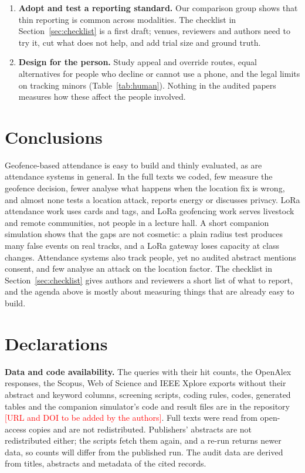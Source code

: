 \documentclass[12pt]{article}
\newcommand{\todo}[1]{\textcolor{red}{[#1]}}
\begin{document}
\begin{enumerate}
\item \textbf{Adopt and test a reporting standard.} Our comparison group shows that thin reporting is common across modalities. The checklist in Section~\ref{sec:checklist} is a first draft; venues, reviewers and authors need to try it, cut what does not help, and add trial size and ground truth.
\item \textbf{Design for the person.} Study appeal and override routes, equal alternatives for people who decline or cannot use a phone, and the legal limits on tracking minors (Table~\ref{tab:human}). Nothing in the audited papers measures how these affect the people involved.
\end{enumerate}

\section{Conclusions}
Geofence-based attendance is easy to build and thinly evaluated, as are attendance systems in general. In the full texts we coded, few measure the geofence decision, fewer analyse what happens when the location fix is wrong, and almost none tests a location attack, reports energy or discusses privacy. LoRa attendance work uses cards and tags, and LoRa geofencing work serves livestock and remote communities, not people in a lecture hall. A short companion simulation shows that the gaps are not cosmetic: a plain radius test produces many false events on real tracks, and a LoRa gateway loses capacity at class changes. Attendance systems also track people, yet no audited abstract mentions consent, and few analyse an attack on the location factor. The checklist in Section~\ref{sec:checklist} gives authors and reviewers a short list of what to report, and the agenda above is mostly about measuring things that are already easy to build.

\section*{Declarations}
\noindent\textbf{Data and code availability.} The queries with their hit counts, the OpenAlex responses, the Scopus, Web of Science and IEEE Xplore exports without their abstract and keyword columns, screening scripts, coding rules, codes, generated tables and the companion simulator's code and result files are in the repository \todo{URL and DOI to be added by the authors}. Full texts were read from open-access copies and are not redistributed. Publishers' abstracts are not redistributed either; the scripts fetch them again, and a re-run returns newer data, so counts will differ from the published run. The audit data are derived from titles, abstracts and metadata of the cited records.
\end{document}
